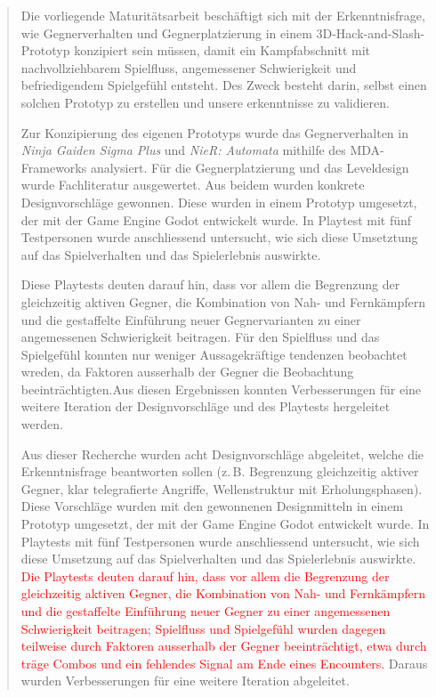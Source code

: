 \documentclass[10pt]{article}
\newcommand{\game}[1]{\textit{#1}}   %
\begin{document}
\begin{abstract}
    Die vorliegende Maturitätsarbeit beschäftigt sich mit der Erkenntnisfrage, wie Gegnerverhalten und Gegnerplatzierung in einem 3D-Hack-and-Slash-Prototyp konzipiert sein müssen, damit ein Kampfabschnitt mit nachvollziehbarem Spielfluss, angemessener Schwierigkeit und befriedigendem Spielgefühl entsteht. Des Zweck besteht darin, selbst einen solchen Prototyp zu erstellen und unsere erkenntnisse zu validieren.

    Zur Konzipierung des eigenen Prototyps wurde das Gegnerverhalten in \game{Ninja Gaiden Sigma Plus} und \game{NieR: Automata} mithilfe des MDA-Frameworks analysiert. Für die Gegnerplatzierung und das Leveldesign wurde Fachliteratur ausgewertet. Aus beidem wurden konkrete Designvorschläge gewonnen. Diese wurden in einem Prototyp umgesetzt, der mit der Game Engine Godot entwickelt wurde. In Playtest mit fünf Testpersonen wurde anschliessend untersucht, wie sich diese Umsetztung auf das Spielverhalten und das Spielerlebnis auswirkte.

    Diese Playtests deuten darauf hin, dass vor allem die Begrenzung der gleichzeitig aktiven Gegner, die Kombination von Nah- und Fernkämpfern und die gestaffelte Einführung neuer Gegnervarianten zu einer angemessenen Schwierigkeit beitragen. Für den Spielfluss und das Spielgefühl konnten nur weniger Aussagekräftige tendenzen beobachtet wreden, da Faktoren ausserhalb der Gegner die Beobachtung beeinträchtigten.Aus diesen Ergebnissen konnten Verbesserungen für eine weitere Iteration der Designvorschläge und des Playtests hergeleitet werden.

    Aus dieser Recherche wurden acht Designvorschläge abgeleitet, welche die Erkenntnisfrage beantworten sollen (z.\,B. Begrenzung gleichzeitig aktiver Gegner, klar telegrafierte Angriffe, Wellenstruktur mit Erholungsphasen). Diese Vorschläge wurden mit den gewonnenen Designmitteln in einem Prototyp umgesetzt, der mit der Game Engine Godot entwickelt wurde. In Playtests mit fünf Testpersonen wurde anschliessend untersucht, wie sich diese Umsetzung auf das Spielverhalten und das Spielerlebnis auswirkte. \textcolor{red}{Die Playtests deuten darauf hin, dass vor allem die Begrenzung der gleichzeitig aktiven Gegner, die Kombination von Nah- und Fernkämpfern und die gestaffelte Einführung neuer Gegner zu einer angemessenen Schwierigkeit beitragen; Spielfluss und Spielgefühl wurden dagegen teilweise durch Faktoren ausserhalb der Gegner beeinträchtigt, etwa durch träge Combos und ein fehlendes Signal am Ende eines Encounters.} Daraus wurden Verbesserungen für eine weitere Iteration abgeleitet.
\end{abstract}
\end{document}
